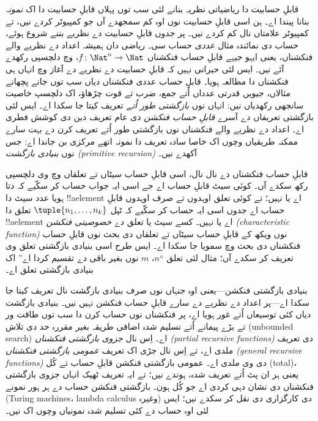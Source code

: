\documentclass[../../../include/open-logic-section]{subfiles}
\begin{document}

قابلِ حسابیت دا ریاضیاتی نظریہ بنانے لئی سب توں پہلاں
قابلِ حسابیت دا اک \emph{نمونہ} بنانا پیندا اے۔ ہن اسی
قابلِ حسابیت نوں اوہ کم سمجھدے آں جو کمپیوٹر کردے نیں،
تے کمپیوٹر علامتاں نال کم کردے نیں۔ پر جدوں قابلِ حسابیت
دے نظریے بننے شروع ہوئے، حساب دی نمائندہ مثال \emph{عددی}
حساب سی۔ ریاضی دان ہمیشہ اعداد دے نظریے والے فنکشناں،
یعنی ایہو جیہے قابلِ حساب فنکشناں $f\colon \Nat^n \to
\Nat$، وچ دلچسپی رکھدے آئے نیں۔ ایس لئی حیرانی نہیں کہ
قابلِ حسابیت دے نظریے دے آغاز وچ انہاں ہی فنکشناں دا
مطالعہ ہویا۔ قابلِ حساب عددی فنکشناں دیاں سب توں جانے
پچھانے مثالاں، جیویں قدرتی عدداں اُتے جمع، ضرب تے قوت
چڑھاؤ، اک دلچسپ خاصیت سانجھی رکھدیاں نیں: انہاں نوں
\emph{بازگشتی طور اُتے} تعریف کیتا جا سکدا اے۔ ایس لئی
بازگشتی تعریفاں دے آسرے \emph{قابلِ حساب فنکشن} دی عام
تعریف دین دی کوشش فطری اے۔ اعداد دے نظریے والے فنکشناں
نوں بازگشتی طور اُتے تعریف کرن دے بہت سارے ممکنہ طریقیاں
وچوں اک خاصا سادہ تعریف دا نمونہ اتھے مرکزی بن جاندا اے:
جس نوں \emph{بنیادی بازگشت (primitive recursion)} آکھدے نیں۔

قابلِ حساب فنکشناں دے نال نال، اسی قابلِ حساب سیٹاں تے
تعلقاں وچ وی دلچسپی رکھ سکدے آں۔ کوئی سیٹ قابلِ حساب اے
جے اسی ایہ جواب حساب کر سکّیے کہ دتا ہویا عدد سیٹ دا
!!a{element} اے یا نہیں؛ تے کوئی تعلق اوہدوں تے صرف اوہدوں
قابلِ حساب اے جدوں اسی ایہ حساب کر سکّیے کہ ٹپل
$\tuple{n_1, \dots, n_k}$ تعلق دا !!a{element} اے یا نہیں۔
کسے سیٹ یا تعلق دے \emph{خصوصیتی فنکشن (characteristic
  function)} نوں ویکھ کے قابلِ حساب سیٹاں تے تعلقاں دی
بحث نوں قابلِ حساب فنکشناں دی بحث وچ سمویا جا سکدا اے۔
ایس طرح اسی بنیادی بازگشتی تعلق وی تعریف کر سکدے آں؛
مثال لئی تعلق ``$n$، $m$ نوں بغیر باقی دے تقسیم کردا اے''
اک بنیادی بازگشتی تعلق اے۔

بنیادی بازگشتی فنکشن---یعنی اوہ جنہاں نوں صرف بنیادی
بازگشت نال تعریف کیتا جا سکدا اے---پر اعداد دے نظریے
دے سارے قابلِ حساب فنکشن نہیں نیں۔ بنیادی بازگشت دیاں
کئی توسیعاں اُتے غور ہویا اے، پر فنکشناں نوں حساب کرن
دا سب توں طاقت ور تے بڑے پیمانے اُتے تسلیم شدہ اضافی
طریقہ بغیر مقررہ حد دی تلاش (unbounded search) اے۔ اِس
نال \emph{جزوی بازگشتی فنکشناں (partial recursive
  functions)} دی تعریف ملدی اے، تے اِس نال جڑی اک
تعریف \emph{عمومی بازگشتی فنکشناں (general recursive
  functions)} دی وی ملدی اے۔ عمومی بازگشتی فنکشن قابلِ
حساب تے کُل (total)، یعنی ہر ان پٹ اُتے تعریف شدہ، ہوندے
نیں؛ تے ایہ تعریف ٹھیک انہاں
جزوی بازگشتی فنکشناں دی نشان دہی کردی اے جو کُل ہون۔
بازگشتی فنکشن حساب دے ہر ہور نمونے (Turing machines،
lambda calculus وغیرہ) دی کارگزاری دی نقل کر سکدے نیں؛
ایس لئی اوہ حساب دے کئی تسلیم شدہ نمونیاں وچوں اک نیں۔
\end{document}
